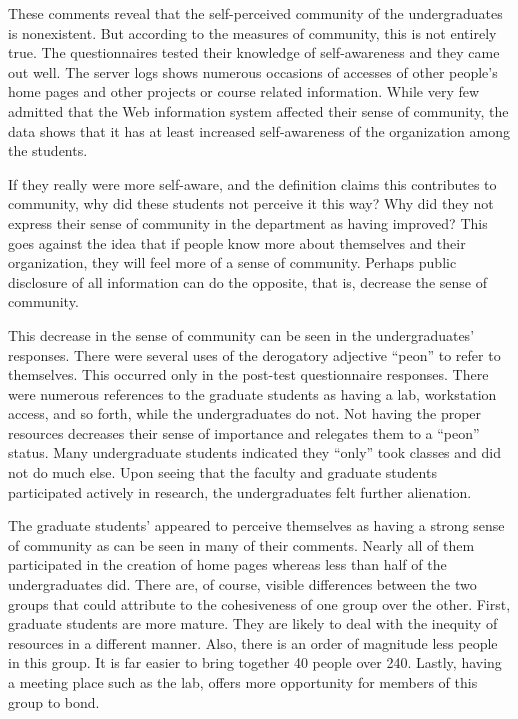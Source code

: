 These comments reveal that the self-perceived community of the undergraduates
is nonexistent.  But according to the measures of community, this is not
entirely true.  The questionnaires tested their knowledge of self-awareness and
they came out well.  The server logs shows numerous occasions of accesses of
other people's home pages and other projects or course related information.
While very few admitted that the Web information system affected their sense of
community, the data shows that it has at least increased self-awareness of the
organization among the students.

If they really were more self-aware, and the definition claims this contributes
to community, why did these students not perceive it this way?  Why did they
not express their sense of community in the department as having improved?
This goes against the idea that if people know more about themselves and their
organization, they will feel more of a sense of community.  Perhaps public
disclosure of all information can do the opposite, that is, decrease the sense
of community.

This decrease in the sense of community can be seen in the undergraduates'
responses.  There were several uses of the derogatory adjective ``peon'' to
refer to themselves.  This occurred only in the post-test questionnaire
responses.  There were numerous references to the graduate students as having a
lab, workstation access, and so forth, while the undergraduates do not.  Not
having the proper resources decreases their sense of importance and relegates
them to a ``peon'' status.  Many undergraduate students indicated they ``only''
took classes and did not do much else.  Upon seeing that the faculty and
graduate students participated actively in research, the undergraduates felt
further alienation.

The graduate students' appeared to perceive themselves as having a strong sense
of community as can be seen in many of their comments.  Nearly all of them
participated in the creation of home pages whereas less than half of the
undergraduates did.  There are, of course, visible differences between the two
groups that could attribute to the cohesiveness of one group over the other.
First, graduate students are more mature.  They are likely to deal with the
inequity of resources in a different manner.  Also, there is an order of
magnitude less people in this group.  It is far easier to bring together 40
people over 240.  Lastly, having a meeting place such as the lab, offers more
opportunity for members of this group to bond.


